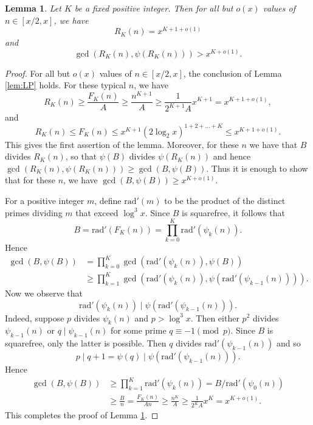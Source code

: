 \documentclass[12pt]{amsart}
\newtheorem{lem}{Lemma}
\theoremstyle{definition}
\theoremstyle{remark}
\newcommand{\rad}{\mathrm{rad}}
\begin{document}
\begin{lem}\label{lem:largegcd1} Let $K$ be a fixed positive integer. Then for all but $o(x)$ values of $n \in [x/2,x]$, we have
\[  R_K(n) = x^{K+1 + o(1)} \]
and
\[ \gcd(R_K(n), \psi(R_K(n))) > x^{K+o(1)}. \]
\end{lem}
\begin{proof} For all but $o(x)$ values of $n \in [x/2,x]$, the conclusion of Lemma \ref{lem:LP} holds. For these typical $n$, we have
\[ R_K(n) \geq \frac{F_K(n)}{A} \geq \frac{n^{K+1}}{A} \geq \frac{1}{2^{K+1} A} x^{K+1}= x^{K+1+o(1)}, \]
and
\[ R_K(n) \leq F_K(n) \leq x^{K+1} (2\log_2{x})^{1+2+\dots + K} \leq x^{K+1+o(1)}. \]
This gives the first assertion of the lemma. Moreover, for these $n$ we have that $B$ divides $R_K(n)$, so that $\psi(B)$ divides $\psi(R_K(n))$ and hence $\gcd(R_K(n), \psi(R_K(n))) \geq \gcd(B, \psi(B))$. Thus it is enough to show that for these $n$, we have $\gcd(B,\psi(B))\geq x^{K+o(1)}$.

For a positive integer $m$, define $\rad'(m)$ to be the product of the distinct primes dividing $m$ that exceed $\log^3{x}$. Since $B$ is squarefree, it follows that
\[ B = \rad'(F_K(n)) = \prod_{k=0}^{K} \rad'(\psi_k(n)). \] Hence
\begin{align*} \gcd(B,\psi(B)) &= \prod_{k=0}^{K}\gcd(\rad'(\psi_k(n)), \psi(B)) \\ &\geq \prod_{k=1}^{K}\gcd(\rad'(\psi_k(n)), \psi(\rad'(\psi_{k-1}(n)))). \end{align*}
Now we observe that \[ \rad'(\psi_k(n)) \mid \psi(\rad'(\psi_{k-1}(n))). \]
Indeed, suppose $p$ divides $\psi_k(n)$ and $p > \log^3{x}$. Then either $p^2$ divides $\psi_{k-1}(n)$ or $q \mid \psi_{k-1}(n)$ for some prime $q\equiv -1\pmod{p}$. Since $B$ is squarefree, only the latter is possible. Then $q$ divides $\rad'(\psi_{k-1}(n))$ and so \[ p \mid q+1 = \psi(q) \mid \psi(\rad'(\psi_{k-1}(n))). \]
Hence
\begin{align*} \gcd(B,\psi(B)) &\geq \prod_{k=1}^{K} \rad'(\psi_k(n)) = B/\rad'(\psi_0(n)) \\ &\geq \frac{B}{n} = \frac{F_K(n)}{An} \geq \frac{n^{K}}{A} \geq \frac{1}{2^K A} x^{K} = x^{K+o(1)}.
\end{align*}
This completes the proof of Lemma \ref{lem:largegcd1}.
\end{proof}
\end{document}
